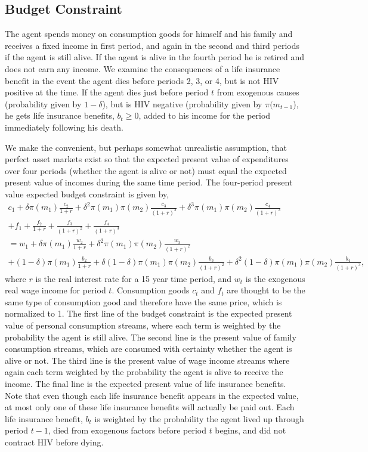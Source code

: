 \documentclass[12pt]{article}
\newcommand{\beq}{\begin{equation}}
\newcommand{\eeq}{\end{equation}}
\newcommand{\ds}{\displaystyle}
\begin{document}
\subsection{Budget Constraint}
The agent spends money on consumption goods for himself and his family and receives a fixed income in first period, and again in the second and third periods if the agent is still alive.  If the agent is alive in the fourth period he is retired and does not earn any income.  We examine the consequences of a life insurance benefit in the event the agent dies before periods 2, 3, or 4, but is not HIV positive at the time.  If the agent dies just before period $t$ from exogenous causes (probability given by $1-\delta$), but is HIV negative (probability given by $\pi(m_{t-1}$), he gets life insurance benefits, $b_t \geq 0$, added to his income for the period immediately following his death.

We make the convenient, but perhaps somewhat unrealistic assumption, that perfect asset markets exist so that the expected present value of expenditures over four periods (whether the agent is alive or not) must equal the expected present value of incomes during the same time period.  The four-period present value expected budget constraint is given by,
\beq \label{eq:lifebc} \begin{array}{c} \ds c_1 + \delta \pi(m_1) \frac{c_2}{1+r} + \delta^2 \pi(m_1) \pi(m_2) \frac{c_3}{\left(1+r\right)^2} + \delta^3 \pi(m_1) \pi(m_2) \frac{c_4}{\left(1+r\right)^3}  \\ [1pc]
\ds + f_1 + \frac{f_2}{1+r} + \frac{f_3}{\left(1+r\right)^2} + \frac{f_4}{\left(1+r\right)^3} \\ [1pc]
\ds = w_1 + \delta \pi(m_1) \frac{w_2}{1+r} + \delta^2 \pi(m_1) \pi(m_2) \frac{w_3}{(1+r)^2} \\ [1pc]
\ds + (1-\delta) \pi(m_1) \frac{b_2}{1+r} + \delta (1-\delta) \pi(m_1) \pi(m_2) \frac{b_3}{(1+r)^2} + \delta^2 (1-\delta) \pi(m_1) \pi(m_2) \frac{b_4}{(1+r)^3}, \end{array} \eeq
where $r$ is the real interest rate for a 15 year time period, and $w_t$ is the exogenous real wage income for period $t$.  Consumption goods $c_t$ and $f_t$ are thought to be the same type of consumption good and therefore have the same price, which is normalized to 1.  The first line of the budget constraint is the expected present value of personal consumption streams, where each term is weighted by the probability the agent is still alive.  The second line is the present value of family consumption streams, which are consumed with certainty whether the agent is alive or not.  The third line is the present value of wage income streams where again each term weighted by the probability the agent is alive to receive the income.  The final line is the expected present value of life insurance benefits.  Note that even though each life insurance benefit appears in the expected value, at most only one of these life insurance benefits will actually be paid out.  Each life insurance benefit, $b_t$ is weighted by the probability the agent lived up through period $t-1$, died from exogenous factors before period $t$ begins, and did not contract HIV before dying.
\end{document}
